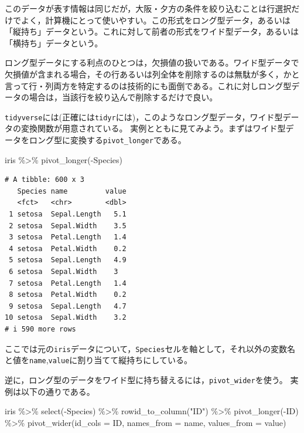\documentclass[
  a4paper,
]{ltjsbook}
\newenvironment{Shaded}{\begin{snugshade}}{\end{snugshade}}
\newcommand{\AttributeTok}[1]{\textcolor[rgb]{0.40,0.45,0.13}{#1}}
\newcommand{\FunctionTok}[1]{\textcolor[rgb]{0.28,0.35,0.67}{#1}}
\newcommand{\NormalTok}[1]{\textcolor[rgb]{0.00,0.23,0.31}{#1}}
\newcommand{\SpecialCharTok}[1]{\textcolor[rgb]{0.37,0.37,0.37}{#1}}
\newcommand{\StringTok}[1]{\textcolor[rgb]{0.13,0.47,0.30}{#1}}
\begin{document}
このデータが表す情報は同じだが，大阪・夕方の条件を絞り込むことは行選択だけでよく，計算機にとって使いやすい。この形式をロング型データ，あるいは「縦持ち」データという。これに対して前者の形式をワイド型データ，あるいは「横持ち」データという。

ロング型データにする利点のひとつは，欠損値の扱いである。ワイド型データで欠損値が含まれる場合，その行あるいは列全体を削除するのは無駄が多く，かと言って行・列両方を特定するのは技術的にも面倒である。これに対しロング型データの場合は，当該行を絞り込んで削除するだけで良い。

\texttt{tidyverse}には(正確には\texttt{tidyr}には)，このようなロング型データ，ワイド型データの変換関数が用意されている。
実例とともに見てみよう。まずはワイド型データをロング型に変換する\texttt{pivot\_longer}である。

\begin{Shaded}
\begin{Highlighting}[]
\NormalTok{iris }\SpecialCharTok{\%\textgreater{}\%} \FunctionTok{pivot\_longer}\NormalTok{(}\SpecialCharTok{{-}}\NormalTok{Species)}
\end{Highlighting}
\end{Shaded}

\begin{verbatim}
# A tibble: 600 x 3
   Species name         value
   <fct>   <chr>        <dbl>
 1 setosa  Sepal.Length   5.1
 2 setosa  Sepal.Width    3.5
 3 setosa  Petal.Length   1.4
 4 setosa  Petal.Width    0.2
 5 setosa  Sepal.Length   4.9
 6 setosa  Sepal.Width    3  
 7 setosa  Petal.Length   1.4
 8 setosa  Petal.Width    0.2
 9 setosa  Sepal.Length   4.7
10 setosa  Sepal.Width    3.2
# i 590 more rows
\end{verbatim}

ここでは元の\texttt{iris}データについて，\texttt{Species}セルを軸として，それ以外の変数名と値を\texttt{name},\texttt{value}に割り当てて縦持ちにしている。

逆に，ロング型のデータをワイド型に持ち替えるには，\texttt{pivot\_wider}を使う。
実例は以下の通りである。

\begin{Shaded}
\begin{Highlighting}[]
\NormalTok{iris }\SpecialCharTok{\%\textgreater{}\%}
  \FunctionTok{select}\NormalTok{(}\SpecialCharTok{{-}}\NormalTok{Species) }\SpecialCharTok{\%\textgreater{}\%}
  \FunctionTok{rowid\_to\_column}\NormalTok{(}\StringTok{"ID"}\NormalTok{) }\SpecialCharTok{\%\textgreater{}\%}
  \FunctionTok{pivot\_longer}\NormalTok{(}\SpecialCharTok{{-}}\NormalTok{ID) }\SpecialCharTok{\%\textgreater{}\%}
  \FunctionTok{pivot\_wider}\NormalTok{(}\AttributeTok{id\_cols =}\NormalTok{ ID, }\AttributeTok{names\_from =}\NormalTok{ name, }\AttributeTok{values\_from =}\NormalTok{ value)}
\end{Highlighting}
\end{Shaded}
\end{document}
